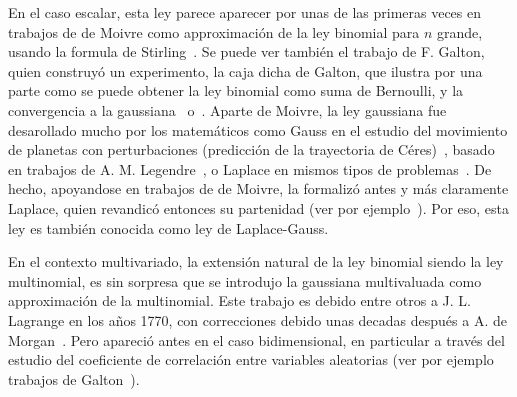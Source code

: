 \label{Sssec:MP:Gaussiana}

En el caso escalar,  esta ley parece aparecer por unas de  las primeras veces en
trabajos de de  Moivre como approximaci\'on de la ley  binomial para $n$ grande,
usando la formula de Stirling~\cite{Moi30, Moi33, Moi56, Pea24, PeaMoi26, Dem33,
  Hal84,  Hal90,  JohKot95:v1, DavEdw01,  Hal06}.   Se  puede  ver tambi\'en  el
trabajo  de F.   Galton,  quien construy\'o  un  experimento, la  caja dicha  de
Galton, que  ilustra por una  parte como se  puede obtener la ley  binomial como
suma   de  Bernoulli,   y  la   convergencia  a   la  gaussiana~\cite[Figs.~7-9,
p.~63]{Gal89}  o~\cite[p.~38]{Pea20}.  Aparte  de Moivre,  la ley  gaussiana fue
desarollado mucho por los matem\'aticos  como Gauss en el estudio del movimiento
de   planetas   con   perturbaciones   (predicci\'on  de   la   trayectoria   de
C\'eres)~\cite{Gau09,  Pea24, DavEdw01,  Hal06}, basado  en trabajos  de  A.  M.
Legendre~\cite{Leg05,   DavEdw01,  Hal06},   o  Laplace   en  mismos   tipos  de
problemas~\cite{Lap09,  Lap09:Supp, Lap20, Pea24,  DavEdw01, Hal06}.   De hecho,
apoyandose en  trabajos de  de Moivre, la  formaliz\'o antes y  m\'as claramente
Laplace,    quien    revandic\'o     entonces    su    partenidad    (ver    por
ejemplo~\cite{Pea20}).   Por eso,  esta ley  es tambi\'en  conocida como  ley de
Laplace-Gauss.

En el contexto multivariado, la extensi\'on natural de la ley binomial siendo la
ley multinomial, es sin sorpresa  que se introdujo la gaussiana multivaluada como
approximaci\'on de la multinomial.  Este trabajo  es debido entre otros a J.  L.
Lagrange en  los a\~nos 1770, con  correcciones debido unas  decadas despu\'es a
A. de  Morgan~\cite{Mor38}. Pero apareci\'o  antes en el caso  bidimensional, en
particular  a  trav\'es  del  estudio  del coeficiente  de  correlaci\'on  entre
variables   aleatorias  (ver   por  ejemplo   trabajos   de  Galton~\cite{Gal77,
  Gal77:Nature, Pea20}).

